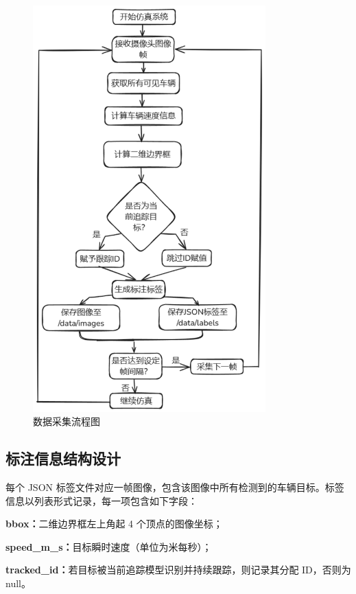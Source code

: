 \begin{figure}[H]
    \centering
    \includegraphics[width=0.8\textwidth]{images/图7 数据采集流程图.pdf}  %
    \caption{数据采集流程图}
    \label{fig:example_image}  %
\end{figure}

\subsection{标注信息结构设计}

每个 JSON 标签文件对应一帧图像，包含该图像中所有检测到的车辆目标。标签信息以列表形式记录，每一项包含如下字段：

\textbf{bbox：}二维边界框左上角起 4 个顶点的图像坐标；

\textbf{speed\_m\_s：}目标瞬时速度（单位为米每秒）；

\textbf{tracked\_id：}若目标被当前追踪模型识别并持续跟踪，则记录其分配 ID，否则为 null。


